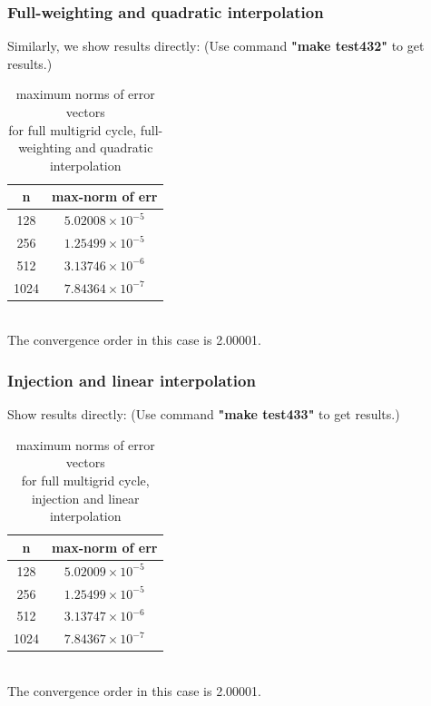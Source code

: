 \documentclass[a4paper,twocolumn]{article}
\theoremstyle{definition}
\begin{document}
\subsubsection{Full-weighting and quadratic interpolation}
Similarly, we show results directly: (Use command \textbf{"make test432"} to get results.)
\begin{table}[!htp]
	\centering
	\begin{tabular}{|c|c|}
		\hline	
		n  & max-norm of err \\
		\hline		
		128 & $5.02008\times 10^{-5}$ \\
		\hline		
		256 & $1.25499\times 10^{-5}$ \\
		\hline		
		512 & $3.13746\times 10^{-6}$ \\
		\hline		
		1024 & $7.84364\times 10^{-7}$ \\
		\hline
	\end{tabular}
	\caption{maximum norms of error vectors \\for full multigrid cycle, full-weighting and quadratic interpolation}
\end{table}\\
The convergence order in this case is 2.00001.
\subsubsection{Injection and linear interpolation}
Show results directly: (Use command \textbf{"make test433"} to get results.)
\begin{table}[!htp]
	\centering
	\begin{tabular}{|c|c|}
		\hline	
		n  & max-norm of err \\
		\hline		
		128 & $5.02009\times 10^{-5}$ \\
		\hline		
		256 & $1.25499\times 10^{-5}$ \\
		\hline		
		512 & $3.13747\times 10^{-6}$ \\
		\hline		
		1024 & $7.84367\times 10^{-7}$ \\
		\hline
	\end{tabular}
	\caption{maximum norms of error vectors \\for full multigrid cycle, injection and linear interpolation}
\end{table}\\
The convergence order in this case is 2.00001.
\end{document}
